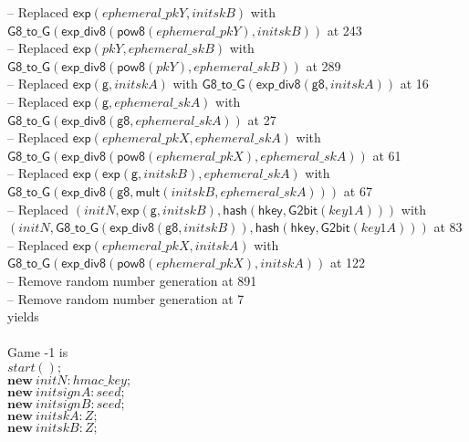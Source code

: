 \documentclass{article}
\newcommand{\cinput}[2]{{#1}({#2})}
\newcommand{\kw}[1]{\mathbf{#1}}
\newcommand{\kwf}[1]{\mathsf{#1}}
\newcommand{\var}[1]{\mathit{#1}}
\newcommand{\kwt}[1]{\mathit{#1}}
\newcommand{\kwc}[1]{\mathit{#1}}
\begin{document}
\begin{tabbing}
\qquad -- Replaced $\kwf{exp}(\var{ephemeral{\_}pkY}, \var{initskB})$ with $\kwf{G8{\_}to{\_}G}(\kwf{exp{\_}div8}(\kwf{pow8}(\var{ephemeral{\_}pkY}), \var{initskB}))$ at 243\\
\qquad -- Replaced $\kwf{exp}(\var{pkY}, \var{ephemeral{\_}skB})$ with $\kwf{G8{\_}to{\_}G}(\kwf{exp{\_}div8}(\kwf{pow8}(\var{pkY}), \var{ephemeral{\_}skB}))$ at 289\\
\qquad -- Replaced $\kwf{exp}(\kwf{g}, \var{initskA})$ with $\kwf{G8{\_}to{\_}G}(\kwf{exp{\_}div8}(\kwf{g8}, \var{initskA}))$ at 16\\
\qquad -- Replaced $\kwf{exp}(\kwf{g}, \var{ephemeral{\_}skA})$ with $\kwf{G8{\_}to{\_}G}(\kwf{exp{\_}div8}(\kwf{g8}, \var{ephemeral{\_}skA}))$ at 27\\
\qquad -- Replaced $\kwf{exp}(\var{ephemeral{\_}pkX}, \var{ephemeral{\_}skA})$ with $\kwf{G8{\_}to{\_}G}(\kwf{exp{\_}div8}(\kwf{pow8}(\var{ephemeral{\_}pkX}), \var{ephemeral{\_}skA}))$ at 61\\
\qquad -- Replaced $\kwf{exp}(\kwf{exp}(\kwf{g}, \var{initskB}), \var{ephemeral{\_}skA})$ with $\kwf{G8{\_}to{\_}G}(\kwf{exp{\_}div8}(\kwf{g8}, \kwf{mult}(\var{initskB}, \var{ephemeral{\_}skA})))$ at 67\\
\qquad -- Replaced $\kwf{}(\var{initN}, \kwf{exp}(\kwf{g}, \var{initskB}), \kwf{hash}(\kwf{hkey}, \kwf{G2bit}(\var{key1A})))$ with $\kwf{}(\var{initN}, \kwf{G8{\_}to{\_}G}(\kwf{exp{\_}div8}(\kwf{g8}, \var{initskB})), \kwf{hash}(\kwf{hkey}, \kwf{G2bit}(\var{key1A})))$ at 83\\
\qquad -- Replaced $\kwf{exp}(\var{ephemeral{\_}pkX}, \var{initskA})$ with $\kwf{G8{\_}to{\_}G}(\kwf{exp{\_}div8}(\kwf{pow8}(\var{ephemeral{\_}pkX}), \var{initskA}))$ at 122\\
\qquad -- Remove random number generation at 891\\
\qquad -- Remove random number generation at 7\\
yields\\
\\
Game -1 is\\
\>$\cinput{\kwc{start}}{};$\\
\>$\kw{new}\ \var{initN}: \kwt{hmac{\_}key};$\\
\>$\kw{new}\ \var{initsignA}: \kwt{seed};$\\
\>$\kw{new}\ \var{initsignB}: \kwt{seed};$\\
\>$\kw{new}\ \var{initskA}: \kwt{Z};$\\
\>$\kw{new}\ \var{initskB}: \kwt{Z};$\\

\end{tabbing}
\end{document}
